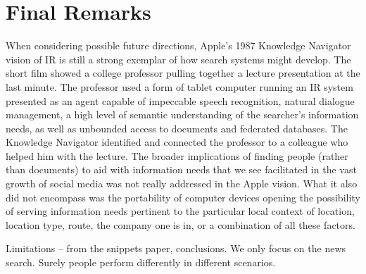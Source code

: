 \section{Final Remarks}

When considering possible future directions, Apple’s 1987 Knowledge Navigator vision of IR is still a strong exemplar of how search systems might develop. The short film showed a college professor pulling together a lecture presentation at the last minute. The professor used a form of tablet computer running an IR system presented as an agent capable of impeccable speech recognition, natural dialogue management, a high level of semantic understanding of the searcher’s information needs, as well as unbounded access to documents and federated databases.
The Knowledge Navigator identified and connected the professor to a colleague who helped him with the lecture. The broader implications of finding people (rather than documents) to aid with information needs that we see facilitated in the vast growth of social media was not really addressed in the Apple vision. What it also did not encompass was the portability of computer devices opening the possibility of serving information needs pertinent to the particular local context of location, location type, route, the company one is in, or a combination of all these factors. 



Limitations -- from the snippets paper, conclusions. We only focus on the news search. Surely people perform differently in different scenarios.